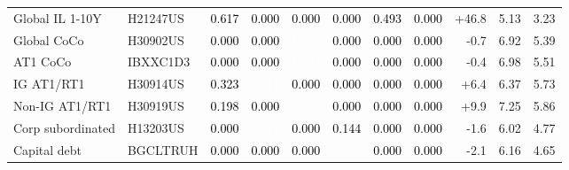 \documentclass[a4paper,review]{cas-sc}
\begin{document}
\begin{table}[pos=htbp]
\begin{adjustbox}{max width=\linewidth}
\begin{tabular}{llrrrrrrrrr}
Global IL 1-10Y & H21247US & \cellcolor[HTML]{F2A17F}\textcolor{black}{0.617} & \cellcolor[HTML]{FFFFFF}\textcolor{black}{0.000} & \cellcolor[HTML]{FFFFFF}\textcolor{black}{0.000} & \cellcolor[HTML]{FFFFFF}\textcolor{black}{0.000} & \cellcolor[HTML]{F7B799}\textcolor{black}{0.493} & \cellcolor[HTML]{FFFFFF}\textcolor{black}{0.000} & +46.8 & 5.13 & 3.23 \\
Global CoCo & H30902US & \cellcolor[HTML]{FFFFFF}\textcolor{black}{0.000} & \cellcolor[HTML]{FFFFFF}\textcolor{black}{0.000} & \cellcolor[HTML]{B72230}\textcolor{white}{1.156} & \cellcolor[HTML]{FFFFFF}\textcolor{black}{0.000} & \cellcolor[HTML]{FFFFFF}\textcolor{black}{0.000} & \cellcolor[HTML]{FFFFFF}\textcolor{black}{0.000} & -0.7 & 6.92 & 5.39 \\
AT1 CoCo & IBXXC1D3 & \cellcolor[HTML]{FFFFFF}\textcolor{black}{0.000} & \cellcolor[HTML]{FFFFFF}\textcolor{black}{0.000} & \cellcolor[HTML]{B41C2D}\textcolor{white}{1.183} & \cellcolor[HTML]{FFFFFF}\textcolor{black}{0.000} & \cellcolor[HTML]{FFFFFF}\textcolor{black}{0.000} & \cellcolor[HTML]{FFFFFF}\textcolor{black}{0.000} & -0.4 & 6.98 & 5.51 \\
IG AT1/RT1 & H30914US & \cellcolor[HTML]{FCD7C2}\textcolor{black}{0.323} & \cellcolor[HTML]{BD2D35}\textcolor{white}{1.111} & \cellcolor[HTML]{FFFFFF}\textcolor{black}{0.000} & \cellcolor[HTML]{FFFFFF}\textcolor{black}{0.000} & \cellcolor[HTML]{FFFFFF}\textcolor{black}{0.000} & \cellcolor[HTML]{FFFFFF}\textcolor{black}{0.000} & +6.4 & 6.37 & 5.73 \\
Non-IG AT1/RT1 & H30919US & \cellcolor[HTML]{FBE5D8}\textcolor{black}{0.198} & \cellcolor[HTML]{FFFFFF}\textcolor{black}{0.000} & \cellcolor[HTML]{AE172A}\textcolor{white}{1.213} & \cellcolor[HTML]{FFFFFF}\textcolor{black}{0.000} & \cellcolor[HTML]{FFFFFF}\textcolor{black}{0.000} & \cellcolor[HTML]{FFFFFF}\textcolor{black}{0.000} & +9.9 & 7.25 & 5.86 \\
Corp subordinated & H13203US & \cellcolor[HTML]{FFFFFF}\textcolor{black}{0.000} & \cellcolor[HTML]{D35A4A}\textcolor{white}{0.921} & \cellcolor[HTML]{FFFFFF}\textcolor{black}{0.000} & \cellcolor[HTML]{FAE9DF}\textcolor{black}{0.144} & \cellcolor[HTML]{FFFFFF}\textcolor{black}{0.000} & \cellcolor[HTML]{FFFFFF}\textcolor{black}{0.000} & -1.6 & 6.02 & 4.77 \\
Capital debt & BGCLTRUH & \cellcolor[HTML]{FFFFFF}\textcolor{black}{0.000} & \cellcolor[HTML]{FFFFFF}\textcolor{black}{0.000} & \cellcolor[HTML]{FFFFFF}\textcolor{black}{0.000} & \cellcolor[HTML]{C94741}\textcolor{white}{0.998} & \cellcolor[HTML]{FFFFFF}\textcolor{black}{0.000} & \cellcolor[HTML]{FFFFFF}\textcolor{black}{0.000} & -2.1 & 6.16 & 4.65 \\

\end{tabular}
\end{adjustbox}
\end{table}
\end{document}
